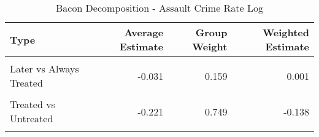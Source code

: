 \begin{table}[H]

\caption{\label{tab:tab:bacondecompositionAssault}Bacon Decomposition - Assault Crime Rate Log}
\centering
\begin{tabular}[t]{lrrr}
\toprule
Type & Average Estimate & Group Weight & Weighted Estimate\\
\midrule
\cellcolor{gray!6}{Earlier vs Later Treated} & \cellcolor{gray!6}{0.149} & \cellcolor{gray!6}{0.068} & \cellcolor{gray!6}{0.008}\\
Later vs Always Treated & -0.031 & 0.159 & 0.001\\
\cellcolor{gray!6}{Later vs Earlier Treated} & \cellcolor{gray!6}{-0.017} & \cellcolor{gray!6}{0.023} & \cellcolor{gray!6}{-0.003}\\
Treated vs Untreated & -0.221 & 0.749 & -0.138\\
\cellcolor{gray!6}{Total TWFE} & \cellcolor{gray!6}{NaN} & \cellcolor{gray!6}{NaN} & \cellcolor{gray!6}{-0.132}\\
\bottomrule
\end{tabular}
\end{table}
